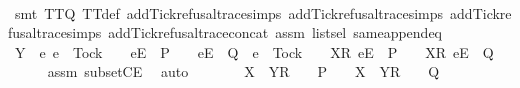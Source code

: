 \begin{isabellebody}
\ \ \ \ \isamarkupfalse%
\ {\isacharparenleft}smt\ TT{}{\isacharunderscore}Q\ TT{}{\isacharunderscore}def\ add{\isacharunderscore}Tick{\isacharunderscore}refusal{\isacharunderscore}trace{\isachardot}simps{\isacharparenleft}{}{\isacharparenright}\ add{\isacharunderscore}Tick{\isacharunderscore}refusal{\isacharunderscore}trace{\isachardot}simps{\isacharparenleft}{}{\isacharparenright}\ add{\isacharunderscore}Tick{\isacharunderscore}refusal{\isacharunderscore}trace{\isachardot}simps{\isacharparenleft}{}{\isacharparenright}\ add{\isacharunderscore}Tick{\isacharunderscore}refusal{\isacharunderscore}trace{\isacharunderscore}concat\ assm{}\ list{\isachardot}sel{\isacharparenleft}{}{\isacharparenright}\ same{\isacharunderscore}append{\isacharunderscore}eq{\isacharparenright}\isanewline
\ \ \ \ \isamarkupfalse%
\isanewline
\ \ \isamarkupfalse%
\ \isamarkupfalse%
\ {\isachardoublequoteopen}Y\ {\isasyminter}\ {\isacharbraceleft}e{\isachardot}\ e\ {\isasymnoteq}\ Tock\ {\isasymand}\ {\isasymrho}{\isacharprime}{\isacharprime}\ {\isacharat}\ {\isacharbrackleft}{\isacharbrackleft}e{\isacharbrackright}\isactrlsub E{\isacharbrackright}\ {\isasymin}\ P\ {\isasymand}\ {\isasymrho}{\isacharprime}{\isacharprime}\ {\isacharat}\ {\isacharbrackleft}{\isacharbrackleft}e{\isacharbrackright}\isactrlsub E{\isacharbrackright}\ {\isasymin}\ Q\ {\isasymor}\ e\ {\isacharequal}\ Tock\ {\isasymand}\ {\isasymrho}{\isacharprime}{\isacharprime}\ {\isacharat}\ {\isacharbrackleft}{\isacharbrackleft}X{\isacharprime}{\isacharbrackright}\isactrlsub R{\isacharcomma}\ {\isacharbrackleft}e{\isacharbrackright}\isactrlsub E{\isacharbrackright}\ {\isasymin}\ P\ {\isasymand}\ {\isasymrho}{\isacharprime}{\isacharprime}\ {\isacharat}\ {\isacharbrackleft}{\isacharbrackleft}X{\isacharprime}{\isacharbrackright}\isactrlsub R{\isacharcomma}\ {\isacharbrackleft}e{\isacharbrackright}\isactrlsub E{\isacharbrackright}\ {\isasymin}\ Q{\isacharbraceright}\ {\isacharequal}\ {\isacharbraceleft}{\isacharbraceright}{\isachardoublequoteclose}\isanewline
\ \ \ \ \isamarkupfalse%
\ assm{}\ subsetCE\ \isamarkupfalse%
\ auto\isanewline
\ \ \isamarkupfalse%
\ \isamarkupfalse%
\ {\isachardoublequoteopen}{\isasymrho}{\isacharprime}{\isacharprime}\ {\isacharat}\ {\isacharbrackleft}X{\isacharprime}\ {\isasymunion}\ Y{\isacharbrackright}\isactrlsub R\ {\isacharhash}\ {\isasymsigma}{\isacharprime}\ {\isasymin}\ P\ {\isasymand}\ {\isasymrho}{\isacharprime}{\isacharprime}\ {\isacharat}\ {\isacharbrackleft}X{\isacharprime}\ {\isasymunion}\ Y{\isacharbrackright}\isactrlsub R\ {\isacharhash}\ {\isasymsigma}{\isacharprime}\ {\isasymin}\ Q{\isachardoublequoteclose}\isanewline

\end{isabellebody}
